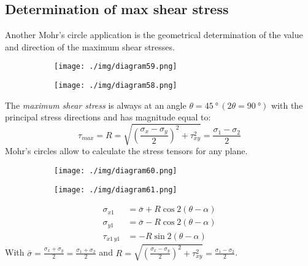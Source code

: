 \subsection{Determination of max shear stress}
Another Mohr's circle application is the geometrical determination of the value and direction of the maximum shear stresses.
\begin{figure}
  \begin{minipage}{0.49\textwidth}
    \begin{figure}[H]
      \centering
      \texttt{[image: ./img/diagram59.png]}
    \end{figure}
  \end{minipage}
  \begin{minipage}{0.5\textwidth}
    \begin{figure}[H]
      \centering
      \texttt{[image: ./img/diagram58.png]}
    \end{figure}
  \end{minipage}
  \caption{}
\end{figure}
The \textit{maximum shear stress} is always at an angle $\theta = \SI{45}{\degree} \, (2\theta=\SI{90}{\degree})$ with the principal stress directions and has magnitude equal to:
\begin{equation}
  \tau_{max} = R = \sqrt{\left(\frac{\sigma_x - \sigma_y}{2}\right)^2 + \tau^2_{xy}} = \frac{\sigma_1-\sigma_2}{2}
\end{equation}
Mohr's circles allow to calculate the stress tensors for any plane.
\begin{figure}
  \begin{minipage}{0.49\textwidth}
    \begin{figure}[H]
      \centering
      \texttt{[image: ./img/diagram60.png]}
    \end{figure}
  \end{minipage}
  \begin{minipage}{0.5\textwidth}
    \begin{figure}[H]
      \centering
      \texttt{[image: ./img/diagram61.png]}
    \end{figure}
  \end{minipage}
  \caption{}
\end{figure}
\begin{align}
  \sigma_{x1}     & = \bar{\sigma} + R\cos 2(\theta - \alpha) \\
  \sigma_{y1}     & = \bar{\sigma} - R\cos 2(\theta - \alpha) \\
  \tau_{x1 \, y1} & = -R \sin 2(\theta - \alpha)
\end{align}
With $\bar{\sigma} = \frac{\sigma_x + \sigma_y}{2} = \frac{\sigma_1 + \sigma_2}{2}$ and $R = \sqrt{\left(\frac{\sigma_x - \sigma_y}{2}\right)^2 + \tau^2_{xy}} = \frac{\sigma_1-\sigma_2}{2}$.
